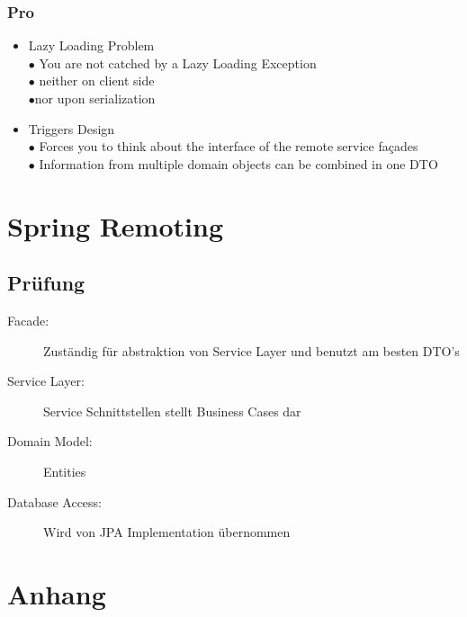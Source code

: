 \documentclass[10pt]{scrartcl}
\begin{document}
\subsubsection{Pro}
\begin{itemize}
\item Lazy Loading Problem\\
$\bullet$ You are not catched by a Lazy Loading Exception\\
\hspace*{0.5cm}$\bullet$ neither on client side\\
\hspace*{0.5cm}$\bullet$nor upon serialization
\item Triggers Design\\
$\bullet$ Forces you to think about the interface of the remote service façades\\
$\bullet$ Information from multiple domain objects can be combined in one DTO
\end{itemize}
\section{Spring Remoting}
\subsection{Prüfung}
\begin{description}
\item[Facade:] Zuständig für abstraktion von Service Layer und benutzt am besten DTO's
\item[Service Layer:] Service Schnittstellen stellt Business Cases dar
\item[Domain Model:] Entities
\item[Database Access:] Wird von JPA Implementation übernommen
\end{description}
\section{Anhang}


\end{document}
